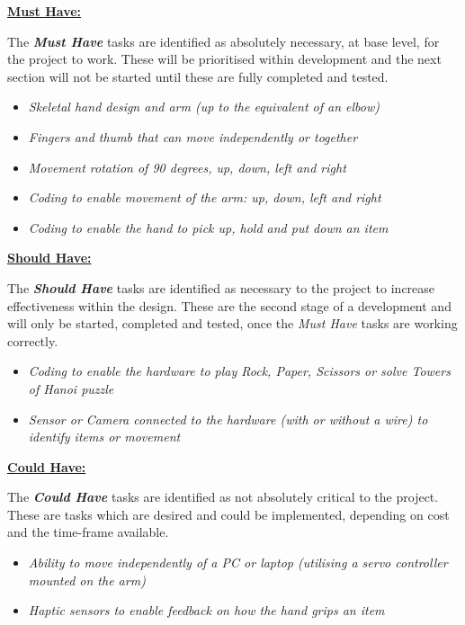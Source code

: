 \documentclass[progress]{cmpreport}
\begin{document}
\textbf{\underline{\large{Must Have:}}}

The \textbf{\textit{Must Have}} tasks are identified as absolutely necessary, at base level, for the project to work. These will be prioritised within development and the next section will not be started until these are fully completed and tested. 

\begin{itemize}
	\item \textit{Skeletal hand design and arm (up to the equivalent of an elbow)}
	\item \textit{Fingers and thumb that can move independently or together}
	\item \textit{Movement rotation of 90 degrees, up, down, left and right}
	\item \textit{Coding to enable movement of the arm: up, down, left and right}
	\item \textit{Coding to enable the hand to pick up, hold and put down an item} %
\end{itemize} 

\textbf{\underline{\large{Should Have:}}}

The \textbf{\textit{Should Have}} tasks are identified as necessary to the project to increase effectiveness within the design. These are the second stage of a development and will only be started, completed and tested, once the \textit{Must Have} tasks are working correctly.

\begin{itemize}	
	\item \textit{Coding to enable the hardware to play Rock, Paper, Scissors or solve Towers of Hanoi puzzle}
	\item \textit{Sensor or Camera connected to the hardware (with or without a wire) to identify items or movement}
\end{itemize}	

\textbf{\underline{\large{Could Have:}}}

The \textbf{\textit{Could Have}} tasks are identified as not absolutely critical to the project.  These are tasks which are desired and could be implemented, depending on cost and the time-frame available. 
\begin{itemize}	
	\item \textit{Ability to move independently of a PC or laptop (utilising a servo controller mounted on the arm)}
	\item \textit{Haptic sensors to enable feedback on how the hand grips an item}
\end{itemize}
\end{document}
